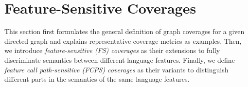 \section{Feature-Sensitive Coverages}\label{sec:fscov}

This section first formulates the general definition of graph coverages for a
given directed graph and explains representative coverage metrics as examples.
%
Then, we introduce \textit{feature-sensitive (FS) coverages} as their
extensions to fully discriminate semantics between different language features.
%
Finally, we define \textit{feature call path-sensitive (FCPS) coverages} as
their variants to distinguish different parts in the semantics of the same
language features.




